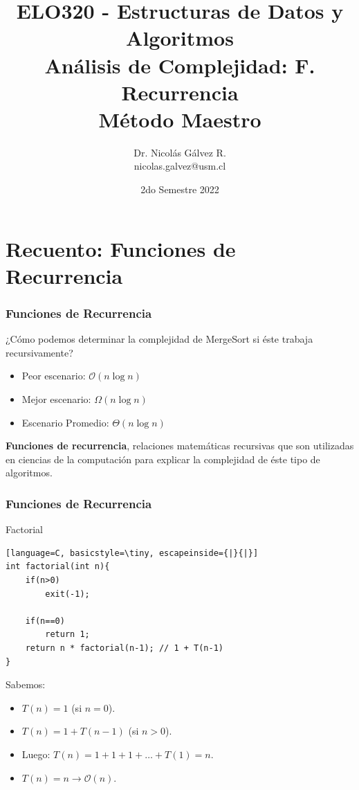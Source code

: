 \documentclass{beamer}
\title{ELO320 - Estructuras de Datos y Algoritmos\\Análisis de Complejidad: F. Recurrencia\\\small{Método Maestro}}
\author{Dr. Nicolás Gálvez R.\\{\small nicolas.galvez@usm.cl}}
\institute{Ing. Civil Telemática - Departamento de Electrónica}
\date{2do Semestre 2022}
\begin{document}
\frame{\titlepage}

%
%

\section{Recuento: Funciones de Recurrencia}
\begin{frame}[fragile]
 \frametitle{Funciones de Recurrencia}
\small
¿Cómo podemos determinar la complejidad de MergeSort si éste trabaja recursivamente?
\begin{itemize}
\item Peor escenario: $\mathcal{O}(n \log n)$
\item Mejor escenario: $\Omega(n \log n)$
\item Escenario Promedio: $\Theta(n \log n)$
\end{itemize}

\textbf{Funciones de recurrencia}, relaciones matemáticas recursivas que son utilizadas en ciencias de la computación para explicar la complejidad de éste tipo de algoritmos.
\end{frame}

\begin{frame}[fragile]
 \frametitle{Funciones de Recurrencia}
\small
\begin{exampleblock}{Factorial}
\begin{lstlisting}[language=C, basicstyle=\tiny, escapeinside={|}{|}]
int factorial(int n){
	if(n>0)
		exit(-1);

	if(n==0)
		return 1;
	return n * factorial(n-1); // 1 + T(n-1)
}
\end{lstlisting}
\end{exampleblock}

Sabemos:
\begin{itemize}
\item $T(n) = 1$ (si $n = 0$).
\item $T(n) = 1 + T(n-1)$ (si $n > 0$).
\item Luego: $T(n) = 1 + 1 + 1 + \dots + T(1) = n$.\pause
\item $T(n) = n \rightarrow \mathcal{O}(n)$.
\end{itemize}
\end{frame}
\end{document}
